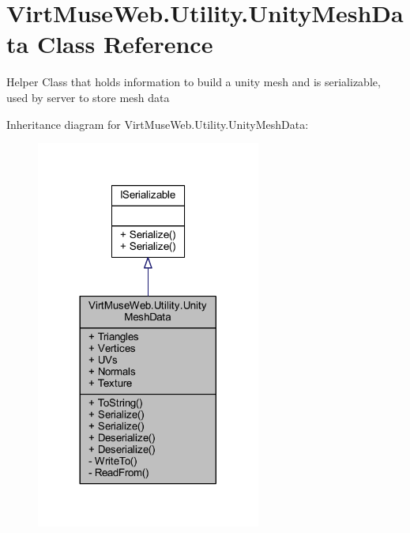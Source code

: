 \hypertarget{class_virt_muse_web_1_1_utility_1_1_unity_mesh_data}{}\section{Virt\+Muse\+Web.\+Utility.\+Unity\+Mesh\+Data Class Reference}
\label{class_virt_muse_web_1_1_utility_1_1_unity_mesh_data}


Helper Class that holds information to build a unity mesh and is serializable, used by server to store mesh data  




Inheritance diagram for Virt\+Muse\+Web.\+Utility.\+Unity\+Mesh\+Data\+:
\nopagebreak
\begin{figure}[H]
\begin{center}
\leavevmode
\includegraphics[width=209pt]{class_virt_muse_web_1_1_utility_1_1_unity_mesh_data__inherit__graph}
\end{center}
\end{figure}


